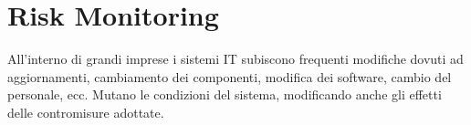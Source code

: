\section{Risk Monitoring}

All'interno di grandi imprese i sistemi IT subiscono frequenti modifiche dovuti
ad aggiornamenti,
cambiamento dei componenti, modifica dei software, cambio del personale, ecc.
Mutano le condizioni del sistema, modificando anche gli effetti delle
contromisure adottate.